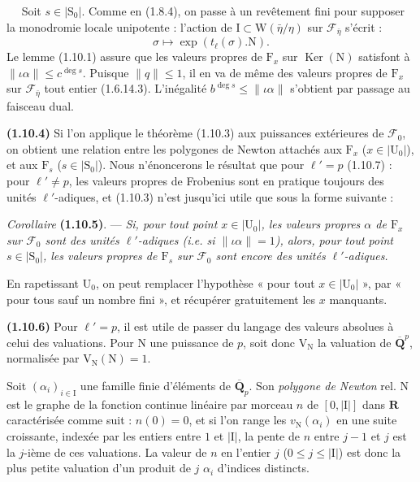 \documentclass[11pt,leqno]{article}
\newcommand{\Page}[1]{\ifvmode\noindent\else\unskip\ \fi{\footnotesize\textcolor{gray}{[p.\,#1]}}\ \ignorespaces}
\begin{document}
\Page{183}
Soit \(s\in\lvert\mathrm{S}_0\rvert\). Comme en (1.8.4), on passe à un revêtement fini pour supposer la monodromie locale unipotente : l’action de \(\mathrm{I}\subset\mathrm{W}(\bar{\eta}/\eta)\) sur \(\mathscr{F}_{\bar{\eta}}\) s’écrit :
\[
\sigma\mapsto\exp(t_\ell(\sigma).\mathrm{N}).
\]
Le lemme (1.10.1) assure que les valeurs propres de \(\mathrm{F}_x\) sur \(\operatorname{Ker}(\mathrm{N})\) satisfont à \(\lVert\iota\alpha\rVert\leq c^{\deg s}\). Puisque \(\lVert q\rVert\leq1\), il en va de même des valeurs propres de \(\mathrm{F}_x\) sur \(\mathscr{F}_{\bar{\eta}}\) tout entier (1.6.14.3). L’inégalité \(b^{\deg s}\leq\lVert\iota\alpha\rVert\) s’obtient par passage au faisceau dual.

\textbf{(1.10.4)} Si l’on applique le théorème (1.10.3) aux puissances extérieures de \(\mathscr{F}_0\), on obtient une relation entre les polygones de Newton attachés aux \(\mathrm{F}_x\) (\(x\in\lvert\mathrm{U}_0\rvert\)), et aux \(\mathrm{F}_s\) (\(s\in\lvert\mathrm{S}_0\rvert\)). Nous n’énoncerons le résultat que pour \(\ell'=p\) (1.10.7) : pour \(\ell'\neq p\), les valeurs propres de Frobenius sont en pratique toujours des unités \(\ell'\)-adiques, et (1.10.3) n’est jusqu’ici utile que sous la forme suivante :

\textit{Corollaire} \textbf{(1.10.5)}. — \textit{Si, pour tout point \(x\in\lvert\mathrm{U}_0\rvert\), les valeurs propres \(\alpha\) de \(\mathrm{F}_x\) sur \(\mathscr{F}_0\) sont des unités \(\ell'\)-adiques (\textup{i.e.} si \(\lVert\iota\alpha\rVert=1\)), alors, pour tout point \(s\in\lvert\mathrm{S}_0\rvert\), les valeurs propres de \(\mathrm{F}_s\) sur \(\mathscr{F}_0\) sont encore des unités \(\ell'\)-adiques.}

En rapetissant \(\mathrm{U}_0\), on peut remplacer l’hypothèse « pour tout \(x\in\lvert\mathrm{U}_0\rvert\) », par « pour tous sauf un nombre fini », et récupérer gratuitement les \(x\) manquants.

\textbf{(1.10.6)} Pour \(\ell'=p\), il est utile de passer du langage des valeurs absolues à celui des valuations. Pour \(\mathrm{N}\) une puissance de \(p\), soit donc \(\mathrm{V}_{\mathrm{N}}\) la valuation de \(\overline{\mathbf{Q}}^{p}\), normalisée par \(\mathrm{V}_{\mathrm{N}}(\mathrm{N})=1\).

Soit \((\alpha_i)_{i\in\mathrm{I}}\) une famille finie d’éléments de \(\overline{\mathbf{Q}}_p\). Son \textit{polygone de Newton} rel. \(\mathrm{N}\) est le graphe de la fonction continue linéaire par morceau \(n\) de \([0,\lvert\mathrm{I}\rvert]\) dans \(\mathbf{R}\) caractérisée comme suit : \(n(0)=0\), et si l’on range les \(v_{\mathrm{N}}(\alpha_i)\) en une suite croissante, indexée par les entiers entre \(1\) et \(\lvert\mathrm{I}\rvert\), la pente de \(n\) entre \(j-1\) et \(j\) est la \(j\)-ième de ces valuations. La valeur de \(n\) en l’entier \(j\) (\(0\leq j\leq\lvert\mathrm{I}\rvert\)) est donc la plus petite valuation d’un produit de \(j\) \(\alpha_i\) d’indices distincts.
\end{document}
